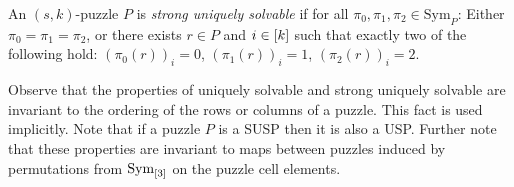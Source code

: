 \documentclass[11pt]{article}
\newcommand\Sym[1]{\ensuremath{\mathrm{Sym}_{#1}}}
\begin{document}

\begin{definition}
  \label{def:strong-USP}
  An $(s,k)$-puzzle $P$ is \emph{strong uniquely solvable} if for all
  $\pi_0, \pi_1, \pi_2 \in \Sym{P}$: Either $\pi_0 = \pi_1 = \pi_2$,
  or there exists $r \in P$ and $i \in [k]$ such that exactly
  two of the following hold: $(\pi_0(r))_i = 0$, $(\pi_1(r))_i = 1$,
  $(\pi_2(r))_i = 2$.
\end{definition}

Observe that the properties of uniquely solvable and strong uniquely
solvable are invariant to the ordering of the rows or columns of a
puzzle.  This fact is used implicitly.  Note that if a puzzle $P$ is a
SUSP then it is also a USP.  Further note that these properties are
invariant to maps between puzzles induced by permutations from
\Sym{\ordset{3}} on the puzzle cell elements.
\end{document}
